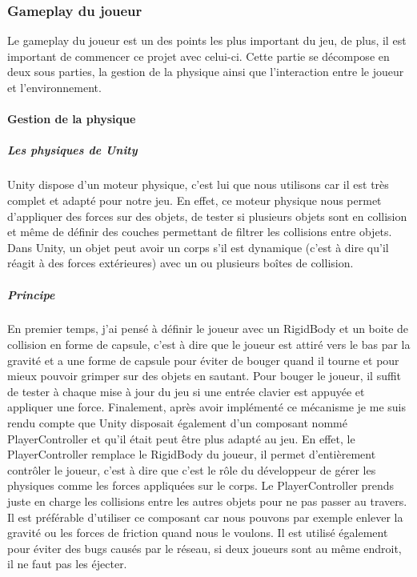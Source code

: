 \documentclass{article}
\begin{document}
\subsubsection{Gameplay du joueur}

Le gameplay du joueur est un des points les plus important du jeu, de plus, il est important de commencer ce projet avec celui-ci. Cette partie se décompose en deux sous parties, la gestion de la physique ainsi que l'interaction entre le joueur et l'environnement.

\paragraph{Gestion de la physique}

\subparagraph{Les physiques de Unity}

Unity dispose d'un moteur physique, c'est lui que nous utilisons car il est très complet et adapté pour notre jeu. En effet, ce moteur physique nous permet d'appliquer des forces sur des objets, de tester si plusieurs objets sont en collision et même de définir des couches permettant de filtrer les collisions entre objets. Dans Unity, un objet peut avoir un corps s'il est dynamique (c'est à dire qu'il réagit à des forces extérieures) avec un ou plusieurs boîtes de collision.

\subparagraph{Principe}

En premier temps, j'ai pensé à définir le joueur avec un RigidBody et un boite de collision en forme de capsule, c'est à dire que le joueur est attiré vers le bas par la gravité et a une forme de capsule pour éviter de bouger quand il tourne et pour mieux pouvoir grimper sur des objets en sautant. Pour bouger le joueur, il suffit de tester à chaque mise à jour du jeu si une entrée clavier est appuyée et appliquer une force. Finalement, après avoir implémenté ce mécanisme je me suis rendu compte que Unity disposait également d'un composant nommé PlayerController et qu'il était peut être plus adapté au jeu. En effet, le PlayerController remplace le RigidBody du joueur, il permet d'entièrement contrôler le joueur, c'est à dire que c'est le rôle du développeur de gérer les physiques comme les forces appliquées sur le corps. Le PlayerController prends juste en charge les collisions entre les autres objets pour ne pas passer au travers. Il est préférable d'utiliser ce composant car nous pouvons par exemple enlever la gravité ou les forces de friction quand nous le voulons. Il est utilisé également pour éviter des bugs causés par le réseau, si deux joueurs sont au même endroit, il ne faut pas les éjecter.
\end{document}
